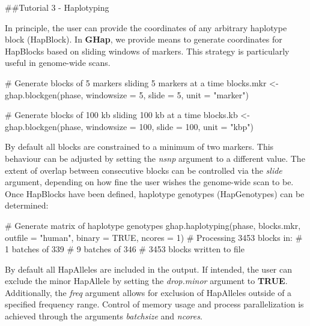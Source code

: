 \documentclass[
]{article}
\newenvironment{Shaded}{}{}
\newcommand{\CommentTok}[1]{\textcolor[rgb]{0.00,0.50,0.00}{#1}}
\newcommand{\DataTypeTok}[1]{#1}
\newcommand{\DecValTok}[1]{#1}
\newcommand{\KeywordTok}[1]{\textcolor[rgb]{0.00,0.00,1.00}{#1}}
\newcommand{\NormalTok}[1]{#1}
\newcommand{\OtherTok}[1]{\textcolor[rgb]{1.00,0.25,0.00}{#1}}
\newcommand{\StringTok}[1]{\textcolor[rgb]{0.00,0.50,0.50}{#1}}
\begin{document}
\pagebreak

\#\#Tutorial 3 - Haplotyping

In principle, the user can provide the coordinates of any arbitrary
haplotype block (HapBlock). In \textbf{GHap}, we provide means to
generate coordinates for HapBlocks based on sliding windows of markers.
This strategy is particularly useful in genome-wide scans.

\begin{Shaded}
\begin{Highlighting}[]
\CommentTok{# Generate blocks of 5 markers sliding 5 markers at a time}
\NormalTok{blocks.mkr <-}\StringTok{ }\KeywordTok{ghap.blockgen}\NormalTok{(phase, }\DataTypeTok{windowsize =} \DecValTok{5}\NormalTok{, }\DataTypeTok{slide =} \DecValTok{5}\NormalTok{, }\DataTypeTok{unit =} \StringTok{"marker"}\NormalTok{)}

\CommentTok{# Generate blocks of 100 kb sliding 100 kb at a time}
\NormalTok{blocks.kb <-}\StringTok{ }\KeywordTok{ghap.blockgen}\NormalTok{(phase, }\DataTypeTok{windowsize =} \DecValTok{100}\NormalTok{, }\DataTypeTok{slide =} \DecValTok{100}\NormalTok{, }\DataTypeTok{unit =} \StringTok{"kbp"}\NormalTok{)}
\end{Highlighting}
\end{Shaded}

By default all blocks are constrained to a minimum of two markers. This
behaviour can be adjusted by setting the \emph{nsnp} argument to a
different value. The extent of overlap between consecutive blocks can be
controlled via the \emph{slide} argument, depending on how fine the user
wishes the genome-wide scan to be. Once HapBlocks have been defined,
haplotype genotypes (HapGenotypes) can be determined:

\begin{Shaded}
\begin{Highlighting}[]
\CommentTok{# Generate matrix of haplotype genotypes}
\KeywordTok{ghap.haplotyping}\NormalTok{(phase, blocks.mkr, }\DataTypeTok{outfile =} \StringTok{"human"}\NormalTok{, }\DataTypeTok{binary =} \OtherTok{TRUE}\NormalTok{, }\DataTypeTok{ncores =} \DecValTok{1}\NormalTok{)}
\CommentTok{#   Processing 3453 blocks in:}
\CommentTok{#   1 batches of 339}
\CommentTok{#   9 batches of 346}
\CommentTok{#   3453 blocks written to file}
\end{Highlighting}
\end{Shaded}

By default all HapAlleles are included in the output. If intended, the
user can exclude the minor HapAllele by setting the \emph{drop.minor}
argument to \textbf{TRUE}. Additionally, the \emph{freq} argument allows
for exclusion of HapAlleles outside of a specified frequency range.
Control of memory usage and process parallelization is achieved through
the arguments \emph{batchsize} and \emph{ncores}.
\end{document}
